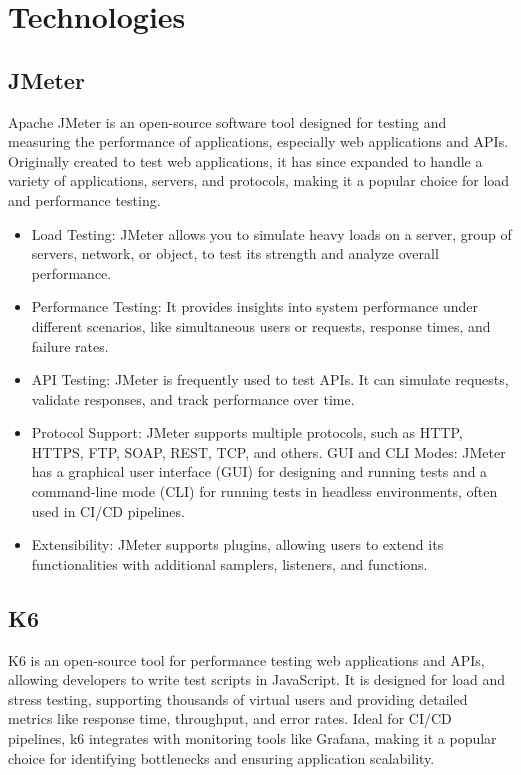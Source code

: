 \documentclass[a4paper,11pt,openright,BCOR=15mm]{scrbook}
\begin{document}
	
	
	
	\chapter{Technologies }
	 \section{JMeter}
	 Apache JMeter is an open-source software tool designed for testing and measuring the performance of applications, especially web applications and APIs. Originally created to test web applications, it has since expanded to handle a variety of applications, servers, and protocols, making it a popular choice for load and performance testing.
	
	\begin{itemize}
		\item Load Testing: JMeter allows you to simulate heavy loads on a server, group of servers, network, or object, to test its strength and analyze overall performance.
		\item Performance Testing: It provides insights into system performance under different scenarios, like simultaneous users or requests, response times, and failure rates.
		\item API Testing: JMeter is frequently used to test APIs. It can simulate requests, validate responses, and track performance over time.
		\item Protocol Support: JMeter supports multiple protocols, such as HTTP, HTTPS, FTP, SOAP, REST, TCP, and others.
		GUI and CLI Modes: JMeter has a graphical user interface (GUI) for designing and running tests and a command-line mode (CLI) for running tests in headless environments, often used in CI/CD pipelines.
		\item Extensibility: JMeter supports plugins, allowing users to extend its functionalities with additional samplers, listeners, and functions.
	\end{itemize}	
	
	\section{K6}
	K6 is an open-source tool for performance testing web applications and APIs, allowing developers to write test scripts in JavaScript. It is designed for load and stress testing, supporting thousands of virtual users and providing detailed metrics like response time, throughput, and error rates. Ideal for CI/CD pipelines, k6 integrates with monitoring tools like Grafana, making it a popular choice for identifying bottlenecks and ensuring application scalability.
	
\end{document}
